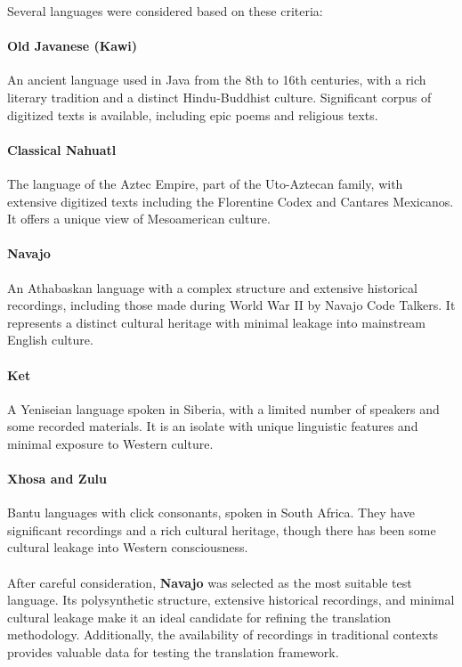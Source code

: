 \documentclass{article}
\begin{document}
Several languages were considered based on these criteria:

\paragraph{Old Javanese (Kawi)} An ancient language used in Java from the 8th to 16th centuries, with a rich literary tradition and a distinct Hindu-Buddhist culture. Significant corpus of digitized texts is available, including epic poems and religious texts.

\paragraph{Classical Nahuatl} The language of the Aztec Empire, part of the Uto-Aztecan family, with extensive digitized texts including the Florentine Codex and Cantares Mexicanos. It offers a unique view of Mesoamerican culture.

\paragraph{Navajo} An Athabaskan language with a complex structure and extensive historical recordings, including those made during World War II by Navajo Code Talkers. It represents a distinct cultural heritage with minimal leakage into mainstream English culture.

\paragraph{Ket} A Yeniseian language spoken in Siberia, with a limited number of speakers and some recorded materials. It is an isolate with unique linguistic features and minimal exposure to Western culture.

\paragraph{Xhosa and Zulu} Bantu languages with click consonants, spoken in South Africa. They have significant recordings and a rich cultural heritage, though there has been some cultural leakage into Western consciousness. \\ \\
After careful consideration, \textbf{Navajo} was selected as the most suitable test language. Its polysynthetic structure, extensive historical recordings, and minimal cultural leakage make it an ideal candidate for refining the translation methodology. Additionally, the availability of recordings in traditional contexts provides valuable data for testing the translation framework.
\end{document}
